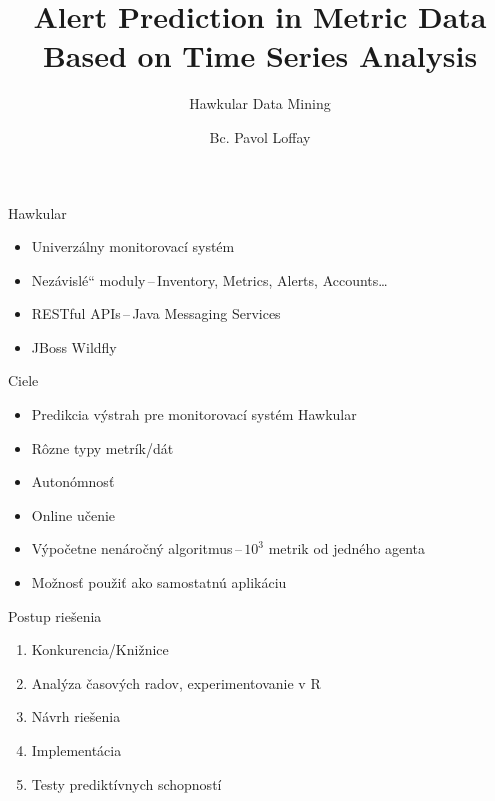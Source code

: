 \documentclass{beamer}
\title{Alert Prediction in Metric Data Based on Time Series Analysis} %
\subtitle{Hawkular Data Mining} %
\author{Bc. Pavol Loffay}
\newcommand\czuv[1]{\quotedblbase #1\textquotedblleft}
\begin{document}
\frame{\maketitle}



\begin{frame}{Hawkular}
  \begin{itemize}
    \item Univerzálny monitorovací systém
    \item \czuv{Nezávislé} moduly\,--\,Inventory, Metrics, Alerts, Accounts\dots
    \item RESTful APIs\,--\,Java Messaging Services
    \item JBoss Wildfly
  \end{itemize}
\end{frame}

\begin{frame}{Ciele}
  \begin{itemize}
    \item Predikcia výstrah pre monitorovací systém Hawkular
    \item Rôzne typy metrík/dát
    \item Autonómnosť
    \item Online učenie
    \item Výpočetne nenáročný algoritmus\,--\,$10^3$ metrik od jedného agenta
    \item Možnosť použiť ako samostatnú aplikáciu
  \end{itemize}
\end{frame}

\begin{frame}{Postup riešenia}
  \begin{enumerate}
    \item Konkurencia/Knižnice
    \item Analýza časových radov, experimentovanie v R
    \item Návrh riešenia
    \item Implementácia
    \item Testy prediktívnych schopností
  \end{enumerate}
\end{frame}
\end{document}
